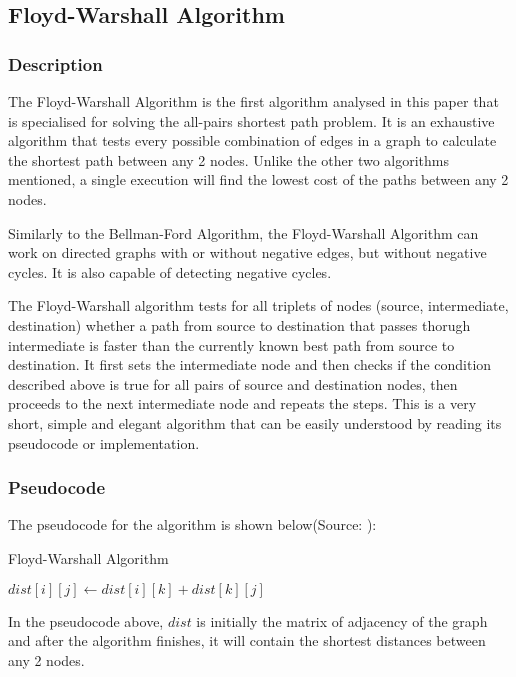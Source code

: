 \documentclass[runningheads]{llncs}
\begin{document}
\subsection{Floyd-Warshall Algorithm}
\subsubsection{Description}
The Floyd-Warshall Algorithm is the first algorithm analysed in this paper that is specialised for solving the all-pairs shortest path problem. It is an exhaustive algorithm that tests every possible combination of edges in a graph to calculate the shortest path between any 2 nodes. Unlike the other two algorithms mentioned, a single execution will find the lowest cost of the paths between any 2 nodes.

Similarly to the Bellman-Ford Algorithm, the Floyd-Warshall Algorithm can work on directed graphs with or without negative edges, but without negative cycles. It is also capable of detecting negative cycles.

The Floyd-Warshall algorithm tests for all triplets of nodes (source, intermediate, destination) whether a path from source to destination that passes thorugh intermediate is faster than the currently known best path from source to destination. It first sets the intermediate node and then checks if the condition described above is true for all pairs of source and destination nodes, then proceeds to the next intermediate node and repeats the steps. This is a very short, simple and elegant algorithm that can be easily understood by reading its pseudocode or implementation.

\subsubsection{Pseudocode}
The pseudocode for the algorithm is shown below(Source: \cite{ref_url_FW}):
\begin{algorithm}
\caption{Floyd-Warshall Algorithm}\label{algBF:cap}
\begin{algorithmic}[1]
				\State $dist[i][j] \gets dist[i][k]+dist[k][j]$
			\EndIf
		\EndFor
	\EndFor
\EndFor
\end{algorithmic}
\end{algorithm}

In the pseudocode above, $dist$ is initially the matrix of adjacency of the graph and after the algorithm finishes, it will contain the shortest distances between any 2 nodes.
\end{document}
